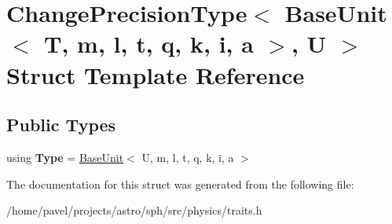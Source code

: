 \hypertarget{structChangePrecisionType_3_01BaseUnit_3_01T_00_01m_00_01l_00_01t_00_01q_00_01k_00_01i_00_01a_01_4_00_01U_01_4}{}\section{Change\+Precision\+Type$<$ Base\+Unit$<$ T, m, l, t, q, k, i, a $>$, U $>$ Struct Template Reference}
\label{structChangePrecisionType_3_01BaseUnit_3_01T_00_01m_00_01l_00_01t_00_01q_00_01k_00_01i_00_01a_01_4_00_01U_01_4}
\subsection*{Public Types}
\begin{DoxyCompactItemize}
\item 
\hypertarget{structChangePrecisionType_3_01BaseUnit_3_01T_00_01m_00_01l_00_01t_00_01q_00_01k_00_01i_00_01a_01_4_00_01U_01_4_a0f7d54b71afb0f564febc09c734a366b}{}\label{structChangePrecisionType_3_01BaseUnit_3_01T_00_01m_00_01l_00_01t_00_01q_00_01k_00_01i_00_01a_01_4_00_01U_01_4_a0f7d54b71afb0f564febc09c734a366b} 
using {\bfseries Type} = \hyperlink{classBaseUnit}{Base\+Unit}$<$ U, m, l, t, q, k, i, a $>$
\end{DoxyCompactItemize}


The documentation for this struct was generated from the following file\+:\begin{DoxyCompactItemize}
\item 
/home/pavel/projects/astro/sph/src/physics/traits.\+h\end{DoxyCompactItemize}
